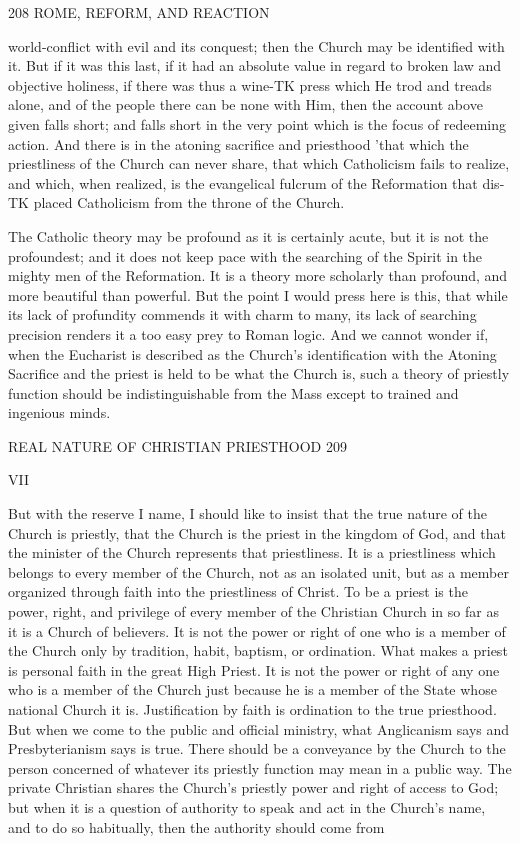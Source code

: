 \documentclass[12pt,a5paper,twoside]{book}
\begin{document}
{{208 ROME, REFORM, AND REACTION 

world-conflict with evil and its conquest; then the 
Church may be identified with it. But if it was this 
last, if it had an absolute value in regard to broken 
law and objective holiness, if there was thus a wine-TK
press which He trod and treads alone, and of the 
people there can be none with Him, then the account 
above given falls short; and falls short in the very point 
which is the focus of redeeming action. And there is 
in the atoning sacrifice and priesthood 'that which the 
priestliness of the Church can never share, that which 
Catholicism fails to realize, and which, when realized, 
is the evangelical fulcrum of the Reformation that dis-TK
placed Catholicism from the throne of the Church. 

The Catholic theory may be profound as it is 
certainly acute, but it is not the profoundest; and it 
does not keep pace with the searching of the Spirit in 
the mighty men of the Reformation. It is a theory 
more scholarly than profound, and more beautiful than 
powerful. But the point I would press here is this, 
that while its lack of profundity commends it with 
charm to many, its lack of searching precision renders 
it a too easy prey to Roman logic. And we cannot 
wonder if, when the Eucharist is described as the 
Church's identification with the Atoning Sacrifice and 
the priest is held to be what the Church is, such a 
theory of priestly function should be indistinguishable 
from the Mass except to trained and ingenious minds. 



REAL NATURE OF CHRISTIAN PRIESTHOOD 209 

VII 

But with the reserve I name, I should like to insist 
that the true nature of the Church is priestly, that the 
Church is the priest in the kingdom of God, and that 
the minister of the Church represents that priestliness. 
It is a priestliness which belongs to every member of 
the Church, not as an isolated unit, but as a member 
organized through faith into the priestliness of Christ. 
To be a priest is the power, right, and privilege of 
every member of the Christian Church in so far as 
it is a Church of believers. It is not the power or 
right of one who is a member of the Church only by 
tradition, habit, baptism, or ordination. What makes 
a priest is personal faith in the great High Priest. 
It is not the power or right of any one who is a 
member of the Church just because he is a member 
of the State whose national Church it is. Justification 
by faith is ordination to the true priesthood. But 
when we come to the public and official ministry, 
what Anglicanism says and Presbyterianism says is 
true. There should be a conveyance by the Church 
to the person concerned of whatever its priestly 
function may mean in a public way. The private 
Christian shares the Church's priestly power and 
right of access to God; but when it is a question of 
authority to speak and act in the Church's name, and to 
do so habitually, then the authority should come from 

}}
\end{document}
